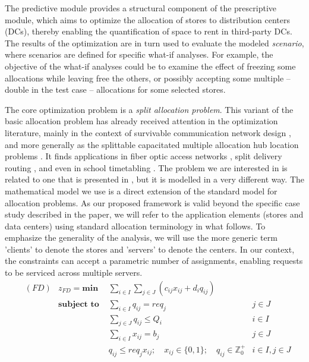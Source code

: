 \documentclass[11pt]{article}
\begin{document}
The predictive module provides a structural component of the prescriptive module, which aims to optimize the allocation of stores to distribution centers (DCs), thereby enabling the quantification of space to rent in third-party DCs. The results of the optimization are in turn used to evaluate the modeled {\it scenario}, where scenarios are defined for specific what-if analyses. For example, the objective of the what-if analyses could be to examine the effect of freezing some allocations while leaving free the others, or possibly accepting some multiple -- double in the test case -- allocations for some selected stores. 

The core optimization problem is a {\em split allocation problem}. This variant of the basic allocation problem has already received attention in the optimization literature, mainly in the context of survivable communication network design \citep{MKE75}, and more generally as the splittable capacitated multiple allocation hub location problems \citep{M05}. It finds applications in fiber optic access networks \citep{KLH11}, split delivery routing \citep{DT89}, and even in school timetabling \citet{BBL07}. The problem we are interested in is related to one that is presented in \citet{ZHHY21}, but it is modelled in a very different way.
The mathematical model we use is a direct extension of the standard model for allocation problems. As our proposed framework is valid beyond the specific case study described in the paper, we will refer to the application elements (stores and data centers) using standard allocation terminology in what follows. To emphasize the generality of the analysis, we will use the more generic term 'clients' to denote the stores and 'servers' to denote the centers. In our context, the constraints can accept a parametric number of assignments, enabling requests to be serviced across multiple servers. 
\begin{align}
	&(FD) & z_{FD} = \textbf{min } & \sum_{i \in I} \sum_{j \in J} ( c_{ij}x_{ij} + d_i q_{ij} ) \label{ALLobj}\\
	& &  \textbf{subject to }
	& \sum_{i \in I} q_{ij} = req_j & j \in J  \label{ALLrequest}\\
	& &  & \sum_{j \in J}q_{ij} \leq Q_i & i \in I \label{ALLcapacity}\\
	& &  & \sum_{i \in I} x_{ij} = b_j & j \in J  \label{ALLnumserv}\\
	& &  & q_{ij} \leq req_j x_{ij}; \quad x_{ij} \in \{0,1\};\quad q_{ij} \in \mathbb{Z}^+_0 & i \in I, j \in J \label{ALLcontin}
\end{align}
\end{document}
